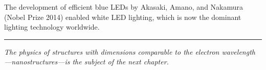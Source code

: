 The development of efficient blue LEDs by Akasaki, Amano, and Nakamura (Nobel Prize 2014) enabled white LED lighting, which is now the dominant lighting technology worldwide.

\vspace{1cm}
\noindent\rule{\textwidth}{0.4pt}
\textit{The physics of structures with dimensions comparable to the electron wavelength---nanostructures---is the subject of the next chapter.}
